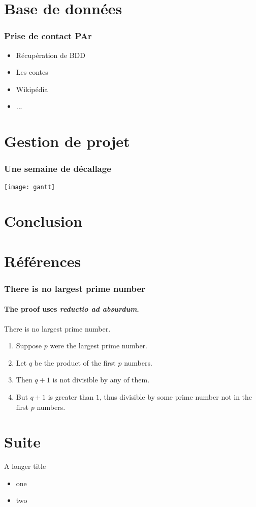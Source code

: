 \documentclass{beamer}
\begin{document}
\section{Base de données}

\begin{frame}
	\frametitle{Prise de contact PAr}
	\begin{itemize}
		\item Récupération de BDD
		\item Les contes
		\item Wikipédia
		\item ...
	\end{itemize}
\end{frame}


\section{Gestion de projet}

\begin{frame}
	\frametitle{Une semaine de décallage}
	\texttt{[image: gantt]}
\end{frame}

\section{Conclusion}

\section{Références}

\begin{frame} 
	\frametitle{There is no largest prime number} 
	\framesubtitle{The proof uses \textit{reductio ad absurdum}.} 
	
	\begin{theorem}
		There is no largest prime number. 
	\end{theorem} 
	
	\begin{enumerate} 
		\item<1-| alert@1> Suppose $p$ were the largest prime number. 
		\item<2-> Let $q$ be the product of the first $p$ numbers. 
		\item<3-> Then $q+1$ is not divisible by any of them. 
		\item<1-> But $q + 1$ is greater than $1$, thus divisible by some prime
			number not in the first $p$ numbers.
	\end{enumerate}
\end{frame}

\section{Suite}
\begin{frame}{A longer title}
	\begin{itemize}
		\item one
		\item two
	\end{itemize}
\end{frame}
\fi
\end{document}
